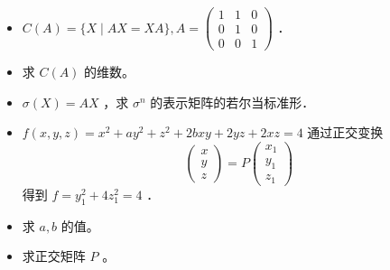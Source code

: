 \documentclass{article}
\begin{document}
\begin{itemize}
  \item[七．] \(C(A)=\{X \mid A X=X A\}, A=\left(\begin{array}{lll}1 & 1 & 0 \\ 0 & 1 & 0 \\ 0 & 0 & 1\end{array}\right)\) ．

  \item[1．] 求 \(C(A)\) 的维数。

  \item[2．] \(\sigma(X)=A X\) ，求 \(\sigma^{n}\) 的表示矩阵的若尔当标准形．
  \item[八．] \(f(x, y, z)=x^{2}+a y^{2}+z^{2}+2 b x y+2 y z+2 x z=4\) 通过正交变换
\[
\left(\begin{array}{l}
x \\
y \\
z
\end{array}\right)=P\left(\begin{array}{l}
x_{1} \\
y_{1} \\
z_{1}
\end{array}\right)
\]
得到 \(f=y_{1}^{2}+4 z_{1}^{2}=4\) ．

  \item[1．] 求 \(a, b\) 的值。

  \item[2．] 求正交矩阵 \(P\) 。
\end{itemize}
\end{document}
